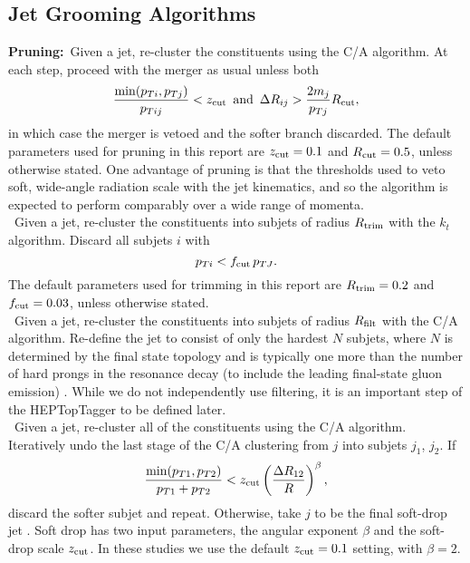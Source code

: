 \subsection{Jet Grooming Algorithms}
\label{sec:groomers}

 {\bf Pruning:}~Given a jet, re-cluster the constituents using the C/A algorithm. At each step, proceed with the merger as usual unless both
 \begin{equation}
 \frac{\mathrm{min}(p_{Ti},p_{Tj})}{p_{Tij}} < z_{\rm cut}\,\,\,\mathrm{and}\,\,\,\Delta R_{ij} > \frac{2m_j}{p_{Tj}} R_{\rm cut},
 \end{equation}
 in which case the merger is vetoed and the softer branch  discarded. The default parameters used for pruning \cite{Ellis:2009me} in this report are $z_{\rm cut}=0.1$ and $R_{\rm cut}=0.5$, unless otherwise stated. One advantage of pruning is that the thresholds used
 to veto soft, wide-angle radiation scale with the jet kinematics, and so the algorithm is expected to perform comparably over a wide range of momenta.\\

 ~Given a jet, re-cluster the constituents into subjets of radius $R_{\rm trim}$ with the $k_t$ algorithm. Discard all subjets $i$ with 
 \begin{equation}
 p_{Ti} < f_{\rm cut} \, p_{TJ}.
 \end{equation}
 The default parameters used for trimming \cite{Krohn:2009th} in this report are $R_{\rm trim}=0.2$ and $f_{\rm cut}=0.03$, unless otherwise stated.\\
 
   ~Given a jet, re-cluster the constituents into subjets of radius $R_{\rm filt}$ with the C/A algorithm. Re-define the jet to consist of only the hardest $N$ subjets, where $N$ is determined by the final state topology and is typically one more than the number of hard prongs in the resonance decay (to include the leading final-state gluon emission) \cite{Butterworth:2008iy}. While we do not independently use filtering, it is an important step of the HEPTopTagger to be defined later.\\
 
 ~Given a jet, re-cluster all of the constituents using the C/A algorithm. Iteratively undo the last stage of the C/A clustering from $j$ into subjets $j_1$, $j_2$. If
 \begin{equation}
 \frac{\mathrm{min}(p_{T1},p_{T2})}{p_{T1}+p_{T2}} < z_{\rm cut} \left(\frac{\Delta R_{12}}{R}\right)^\beta,
 \end{equation}
 discard the softer subjet and repeat. Otherwise, take $j$ to be the final soft-drop jet \cite{Larkoski:2014wba}. Soft drop has two input parameters, the angular exponent $\beta$ and the soft-drop scale $z_{\rm cut}$. In these studies we use the default $z_{\rm cut}=0.1$ setting, with $\beta=2$.  

